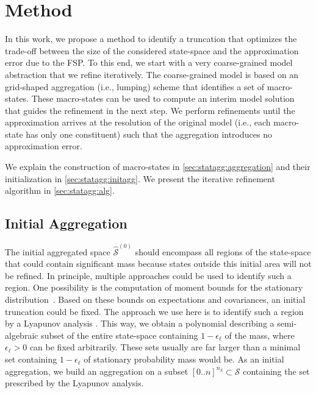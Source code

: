 \section{Method}\label{sec:statagg:method}
In this work, we propose a  method to identify a truncation that optimizes the trade-off between the size of the considered state-space and the approximation error due to the \ac{FSP}.
To this end, we start with a very coarse-grained model abstraction that we refine iteratively. 
The coarse-grained model is based on an grid-shaped aggregation (i.e., lumping) scheme that identifies a set of macro-states.
These macro-states can be used to compute an interim model solution that guides the refinement in the next step.
We perform refinements until the approximation arrives at the resolution of the original model (i.e., each macro-state has only one constituent) such that the aggregation introduces no approximation error.

We explain the construction of macro-states in \autoref{sec:statagg:aggregation} and their initialization in \autoref{sec:statagg:initagg}.
We present the iterative refinement algorithm in \autoref{sec:statagg:alg}.



\subsection{Initial Aggregation}\label{sec:statagg:initagg}
The initial aggregated space $\hat{\mathcal{S}}^{(0)}$ should encompass all regions of the state-space that could contain significant mass because states outside this initial area will not be refined.
In principle, multiple approaches could be used to identify such a region.
One possibility is the computation of moment bounds for the stationary distribution~\cite{ghusinga2017exact,dowdy2018bounds}.
Based on these bounds on expectations and covariances, an initial truncation could be fixed.
The approach we use here is to identify such a  region by a Lyapunov analysis \cite{dayar2011bounding}.
This way, we obtain a polynomial describing a semi-algebraic subset of the entire state-space containing $1-\epsilon_{\ell}$ of the mass, where $\epsilon_{\ell}>0$ can be fixed arbitrarily.
These sets usually are far larger than a minimal set containing $1-\epsilon_{\ell}$ of stationary probability mass would be.
As an initial aggregation, we build an aggregation on a subset $[0..n]^{n_S}\subset \mathcal{S}$ containing the set prescribed by the Lyapunov analysis.


